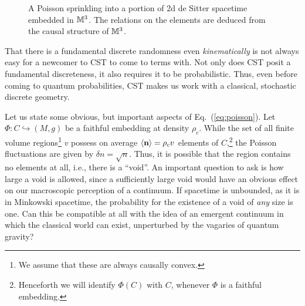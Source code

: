 \begin{figure}[ht]
\centering {}
\caption{A Poisson sprinkling into a portion of 2d de Sitter spacetime embedded in $\mathbb M^3$. The  relations on the elements are deduced from the causal structure of  $\mathbb M^3$.}
\label{causalset.fig}
\end{figure}


That there is a fundamental discrete randomness even \emph{kinematically}  is not always easy for a newcomer to CST to come to terms with.  Not only
does CST posit a fundamental  discreteness,  it also requires it to be probabilistic. Thus, even before coming to 
quantum probabilities, CST makes us work with a  classical, stochastic discrete geometry.  

Let us state some obvious, but important aspects of Eq.~(\ref{eq:poisson}). Let $\Phi: C \hookrightarrow  (M,g)$ be a faithful embedding at density $\rho_c$.  While the set of all finite
volume regions\footnote{We assume that these are always causally convex.}   $v$ possess {on average}  $\langle {\mathbf n} \rangle=\rho_c
v$ elements of $C$,\footnote{Henceforth we will
  identify $\Phi(C)$ with $C$, whenever $\Phi$ is a faithful embedding.} the  Poisson fluctuations are given by  $\delta n =\sqrt{n}$. 
Thus, it is possible that  the region contains no elements at all, i.e., there is a ``void''.   An important
question to ask is how large a void is allowed, since  a  sufficiently large void
would have an obvious  effect on our macroscopic perception of a
continuum. If  spacetime is unbounded, as it is in  Minkowski spacetime,
the probability for the existence of a void of \emph{any} size is one.  Can this be compatible at all with the idea of an
emergent continuum in which the classical world can exist,  unperturbed by the vagaries of quantum gravity? 

